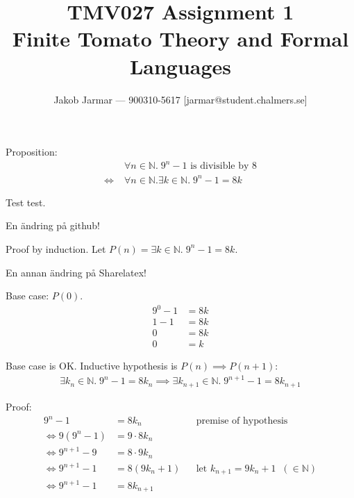 \documentclass{article}
\title{TMV027 Assignment 1 \\ Finite Tomato Theory and Formal Languages}
\author{Jakob Jarmar --- 900310-5617 [jarmar@student.chalmers.se]}
\date{}
\begin{document}
\maketitle

\section{}
Proposition:
\begin{equation}
\begin{split}
& \forall n \in \mathbb{N}.\; 9^n - 1 \text{ is divisible by } 8 \\
\iff \; & \forall n \in \mathbb{N} . \exists k \in \mathbb{N}.\; 9^n - 1 = 8k
\end{split}
\end{equation}

Test test.

En ändring på github!

Proof by induction. Let $P(n) = \exists k \in \mathbb{N}.\; 9^n - 1 = 8k$.

En annan ändring på Sharelatex!

Base case: $P(0)$.
\begin{equation} \label{1_base}
\begin{split}
9^0 - 1 & = 8k \\
1 - 1 & = 8k \\
0 & = 8k \\
0 & = k
\end{split}
\end{equation}

Base case is OK. Inductive hypothesis is $P(n) \implies P(n+1)$:
\begin{equation}
\begin{split}
\exists k_n \in \mathbb{N} .\; 9^n - 1 = 8k_n \implies \exists k_{n+1} \in \mathbb{N}.\; 9^{n+1} - 1 = 8k_{n+1}
\end{split}
\end{equation}

Proof:
\begin{align}
9^n - 1 & = 8k_n && \text{premise of hypothesis} \\
\iff 9(9^n - 1) & = 9 \cdot 8k_n \\
\iff 9^{n+1} - 9 & = 8 \cdot 9k_n \\
\iff 9^{n+1} - 1 & = 8(9k_n + 1) && \text{let $k_{n+1} = 9k_n+1 \;\; (\in \mathbb{N})$} \\
\iff 9^{n+1} - 1 & = 8k_{n+1}
\end{align}
\end{document}
